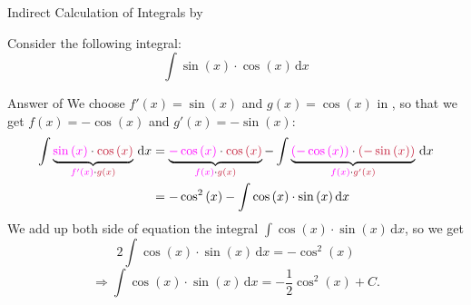\documentclass[10pt, aspectratio=1610]{beamer}
\begin{document}
\begin{frame}{Indirect Calculation of Integrals by }\vspace{10pt}\label{slide:10}
  \begin{tcolorbox}[enhanced,colback=red!5!white,frame style={left color=red!75!black,right color=blue!75!black},rounded corners,title=Exercise]
    Consider the following integral:
    \begin{equation}\label{qe:4}
      \int \sin{(x)}\cdot \cos{(x)}\,\mathrm{d}x
    \end{equation}
    \pause
    \hfill
    \hyperlink{slide:11}{}
  \end{tcolorbox}
\end{frame}

\begin{frame}{Answer of }\vspace{10pt}\label{slide:11}
  We choose $f'(x)=\sin{(x)}$ and $g(x)=\cos{(x)}$ in ,
  so that we get $f(x)=-\cos{(x)}$ and $g'(x)=-\sin{(x)}$:
  \begin{align*}
    \int \underbrace{\textcolor[rgb]{1,0,1}{\sin{(x)}}\cdot \textcolor[rgb]{0.77,0.12,0.23}{\cos{(x)}}}_{\textcolor[rgb]{1,0,1}{f'(x)}\cdot \textcolor[rgb]{0.77,0.12,0.23}{g(x)}}\,\mathrm{d}x
    &= \underbrace{\textcolor[rgb]{1,0,1}{-\cos{(x)}}\cdot \textcolor[rgb]{0.77,0.12,0.23}{\cos{(x)}}}_{\textcolor[rgb]{1,0,1}{f(x)}\cdot \textcolor[rgb]{0.77,0.12,0.23}{g(x)}} 
    - \int \underbrace{\textcolor[rgb]{1,0,1}{(-\cos{(x)})}\cdot \textcolor[rgb]{0.77,0.12,0.23}{(-\sin{(x)})}}_{\textcolor[rgb]{1,0,1}{f(x)}\cdot \textcolor[rgb]{0.77,0.12,0.23}{g'(x)}}\,\mathrm{d}x\\
    &= -\cos^2{(x)} - \int \cos{(x)}\cdot \sin{(x)}\,\mathrm{d}x 
  \end{align*}
  We add up both side of equation the integral $\int \cos{(x)}\cdot \sin{(x)}\,\mathrm{d}x$, so we get 
  \[2 \int \cos{(x)}\cdot \sin{(x)}\,\mathrm{d}x = -\cos^2{(x)}\]
  \[\Longrightarrow \int \cos{(x)}\cdot \sin{(x)}\,\mathrm{d}x = -\frac{1}{2}\cos^2{(x)} + C.\]
  \vspace{10pt}
  \hyperlink{slide:10}{}
\end{frame}
\end{document}
